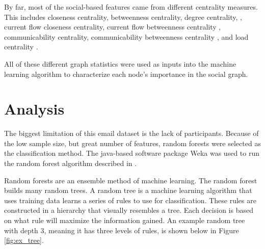 \documentclass{article}
\begin{document}
\par
By far, most of the social-based features came from different centrality measures.  This includes closeness centrality, betweenness centrality, degree centrality, \cite{borgatti2011analyzing}, current flow closeness centrality, current flow betweenness centrality \cite{brandes2005centrality}, communicability centrality, communicability betweenness centrality \cite{estrada2008communicability}, and load centrality \cite{newman2001scientific}.
\par
All of these different graph statistics were used as inputs into the machine learning algorithm to characterize each node's importance in the social graph.


\section{Analysis} \label{Analysis}
The biggest limitation of this email dataset is the lack of participants.  Because of the low sample size, but great number of features, random forests were selected as the classification method.  The java-based software package Weka was used to run the random forest algorithm described in \cite{Breiman2001}.
\par
Random forests are an ensemble method of machine learning.  The random forest builds many random trees.  A random tree is a machine learning algorithm that uses training data learns a series of rules to use for classification.  These rules are constructed in a hierarchy that visually resembles a tree.  Each decision is based on what rule will maximize the information gained.  An example random tree with depth 3, meaning it has three levels of rules, is shown below in Figure \ref{fig:ex_tree}.
\end{document}
